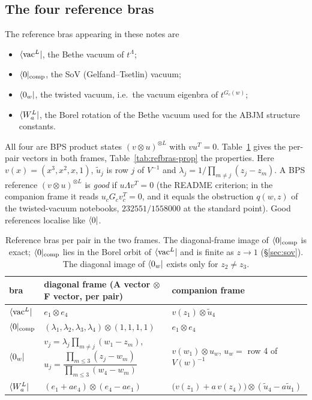 \subsection{The four reference bras}\label{sec:conv-refbras}

The reference bras appearing in these notes are
\begin{itemize}
\item $\langle\mathrm{vac}^L|$, the Bethe vacuum of $t^\Lambda$;
\item $\langle0|_{\rm comp}$, the SoV (Gelfand--Tsetlin) vacuum;
\item $\langle0_w|$, the twisted vacuum, i.e.\ the vacuum eigenbra of $t^{G_c(w)}$;
\item $\langle W_a^L|$, the Borel rotation of the Bethe vacuum used for the ABJM structure constants.
\end{itemize}
All four are BPS product states $(v\otimes u)^{\otimes L}$ with $vu^T=0$. Table~\ref{tab:refbras-vec} gives the per-pair
vectors in both frames, Table~\ref{tab:refbras-prop} the properties. Here $v(x)=(x^3,x^2,x,1)$, $\tilde u_j$ is row $j$ of
$V^{-1}$ and $\lambda_j=1/\prod_{m\ne j}(z_j-z_m)$. A BPS reference $(v\otimes u)^{\otimes L}$ is \emph{good} if
$u\Lambda v^T=0$ (the README criterion; in the companion frame it reads $u_cG_cv_c^T=0$, and it equals the obstruction $q(w,z)$ of the
twisted-vacuum notebooks, $232551/1558000$ at the standard point). Good references localise like $\langle0|$.

\begin{table}[ht]
\centering
\footnotesize
\renewcommand{\arraystretch}{1.3}
\begin{tabular}{@{}>{\raggedright\arraybackslash}p{}>{\raggedright\arraybackslash}p{}>{\raggedright\arraybackslash}p{}@{}}
\toprule
bra & diagonal frame (A vector $\otimes$ F vector, per pair) & companion frame\\
\midrule
$\langle\mathrm{vac}^L|$ & $e_1\otimes e_4$ & $v(z_1)\otimes\tilde u_4$\\
$\langle0|_{\rm comp}$ & $(\lambda_1,\lambda_2,\lambda_3,\lambda_4)\otimes(1,1,1,1)$ & $e_1\otimes e_4$\\
$\langle0_w|$ & $v_j=\lambda_j\prod_{m\ne j}(w_1-z_m)$, \quad $u_j=\dfrac{\prod_{m\le3}(z_j-w_m)}{\prod_{m\le3}(w_4-w_m)}$ &
 $v(w_1)\otimes u_w$, $u_w=$ row 4 of $V(w)^{-1}$\\
$\langle W_a^L|$ & $(e_1+ae_4)\otimes(e_4-ae_1)$ & $\big(v(z_1)+a\,v(z_4)\big)\otimes(\tilde u_4-a\tilde u_1)$\\
\bottomrule
\end{tabular}
\caption{Reference bras per pair in the two frames. The diagonal-frame image of $\langle0|_{\rm comp}$ is exact; $\langle0|_{\rm comp}$
lies in the Borel orbit of $\langle\mathrm{vac}^L|$ and is finite as $z\to1$ (\S\ref{sec:sov}). The diagonal image of $\langle0_w|$ exists
only for $z_2\neq z_3$.}
\label{tab:refbras-vec}
\end{table}

